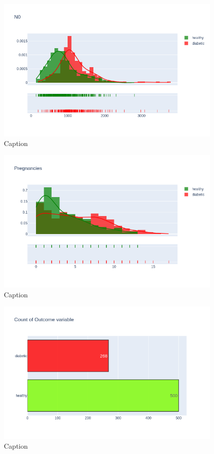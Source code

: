 \documentclass[12pt]{article}
\begin{document}
\begin{figure}[ht]
\centering
\includegraphics[width=1\textwidth]{15.png}
\caption{\label{fig:6} Caption}
\end{figure}

\begin{figure}[ht]
\centering
\includegraphics[width=1\textwidth]{16.png}
\caption{\label{fig:7} Caption}
\end{figure}

\begin{figure}[ht]
\centering
\includegraphics[width=1\textwidth]{1.png}
\caption{\label{fig:8} Caption}
\end{figure}
\end{document}
